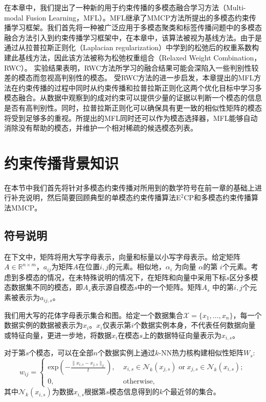 在本章中，我们提出了一种新的用于约束传播的多模态融合学习方法（Multi-modal Fusion Learning，MFL）。MFL继承了MMCP方法所提出的多模态约束传播学习框架。我们首先将一种被广泛应用于多模态聚类和标签传播问题中的多模态融合方法引入到约束传播学习框架中，在本章中，该算法被视为基线方法。由于是通过从拉普拉斯正则化（Laplacian regularization）中学到的松弛后的权重系数构建此基线方法，因此该方法被称为松弛权重组合（Relaxed Weight Combination，RWC）。
实验结果表明，RWC方法所学习的融合结果可能会深陷入一些判别性较差的模态而忽视高判别性的模态。
受RWC方法的进一步启发，本章提出的MFL方法在约束传播的过程中同时从约束传播和拉普拉斯正则化这两个优化目标中学习多模态融合。从数据中观察到的成对约束可以提供少量的证据以判断一个模态的信息是否有高判别性。同时，拉普拉斯正则化可以确保具有更一致的相似性矩阵的模态将受到足够多的重视。所提出的MFL同时还可以作为模态选择器，MFL能够自动消除没有帮助的模态，并维护一个相对稀疏的候选模态列表。

\section{约束传播背景知识}
在本节中我们首先将针对多模态约束传播对所用到的数学符号在前一章的基础上进行补充说明，然后简要回顾典型的单模态约束传播算法E$^2$CP\cite{lu2010constrained}和多模态约束传播算法MMCP\cite{fu2011multi}。
\subsection{符号说明}
在下文中，矩阵将用大写字母表示，向量和标量以小写字母表示。给定矩阵$ {A} \in \mathbb{R}^{n\times m}$，$ a_{ij} $为矩阵$A$在位置$ i,j $的元素。相似地，$ \alpha_{i} $ 为向量 $ {\alpha} $的第 $ i $个元素。考虑到多模态的情况，在未特殊说明的情况下，在矩阵和向量中采用下标$s$区分多模态数据集不同的模态，即${A}_s$表示源自模态$s$中的一个矩阵。矩阵$ {A}_s $ 中的第$ i,j $个元素被表示为$a_{ij,s}$。

我们用大写的花体字母表示集合和图。给定一个数据集合$\mathcal{X} = \{x_1,\dots,x_n \}$，每一个数据实例的数据被表示为$x_i$。$x_i$仅表示第$i$个数据实例本身，不代表任何数据向量或特征向量，更进一步地，将数据$x_i$在模态$s$上的数据特征向量表示为$x_{i,s}$。

对于第$s$个模态，可以在全部$n$个数据实例上通过$k$-NN热力核构建相似性矩阵$ {W}_s$:
\begin{equation}
w_{ij} = \begin{cases} \mathrm{exp}(-\frac{\|x_{i,s}-x_{j,s}\|_{2}}{t}), \; &x_{i,s}\in\mathcal{N}_k(x_{j,s})\;\mathrm{or}\; x_{j,s}\in\mathcal{N}_k(x_{i,s});\\
0,&\mathrm{otherwise,}\end{cases}   
\label{eq3:GaussKer}                              
\end{equation}
其中$\mathcal{N}_k(x_{i,s})$为数据$x_{i,s}$根据第$s$模态信息得到的$k$个最近邻的集合。

